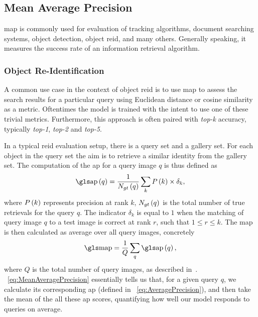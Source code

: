 \subsection{Mean Average Precision}
\label{ssec:MeanAveragePrecision}


\gls{map} is commonly used for evaluation of tracking algorithms, document searching systems, object detection, object \gls{reid}, and many others. Generally speaking, it measures the success rate of an information retrieval algorithm.

\subsubsection{Object Re-Identification}
\label{sssec:ObjectReIdentification}

A common use case in the context of object \gls{reid} is to use \gls{map} to assess the search results for a particular query using Euclidean distance or cosine similarity as a metric. Oftentimes the model is trained with the intent to use one of these trivial metrics. Furthermore, this approach is often paired with \emph{top-k} accuracy, typically \emph{top-1}, \emph{top-2} and \emph{top-5}.

In a typical \gls{reid} evaluation setup, there is a query set and a gallery set. For each object in the query set the aim is to retrieve a similar identity from the gallery set. The computation of the \gls{ap} for a query image $q$ is thus defined as
\begin{equation}
    \label{eq:AveragePrecision}
    \func{\AP}{q} = \frac{1}{\func{N_{gt}}{q}} \sum_{k} \func{P}{k} \times {\delta}_k,
\end{equation}
where ${P} \left( k \right)$ represents precision at rank $k$, ${N_{gt}} \left( q \right)$ is the total number of true retrievals for the query $q$. The indicator ${\delta}_k$ is equal to $1$ when the matching of query image $q$ to a test image is correct at rank $r$, such that $1 \leq r \leq k$. The \gls{map} is then calculated as average over all query images, concretely
\begin{equation}
    \label{eq:MeanAveragePrecision}
    \MAP = \frac{1}{Q} \sum_q \func{\AP}{q},
\end{equation}
where $Q$ is the total number of query images, as described in~\cite{kuma2019vehiclereid}. \eqtext{}~\ref{eq:MeanAveragePrecision} essentially tells us that, for a given query $q$, we calculate its corresponding \gls{ap} (defined in \eqtext{}~\ref{eq:AveragePrecision}), and then take the mean of the all these \gls{ap} scores, quantifying how well our model responds to queries on average.

